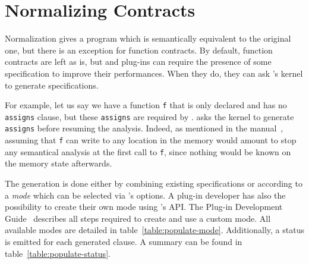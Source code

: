 \section{Normalizing Contracts}\label{sec:normalize-contracts}

Normalization gives a program which is semantically equivalent to the original
one, but there is an exception for function contracts. By default, function
contracts are left as is, but \FramaC and plug-ins can require the presence of
some specification to improve their performances. When they do, they can ask
\FramaC's kernel to generate specifications.

For example, let us say we have a function \texttt{f} that is only declared and
has no \acsl \texttt{assigns} clause, but these \texttt{assigns} are required by
\Eva. \Eva asks the kernel to generate \texttt{assigns} before resuming
the analysis. Indeed, as mentioned in the \acsl manual~\cite{acsl}, assuming
that \texttt{f} can write to any location in the memory would amount to stop any
semantical analysis at the first call to \texttt{f}, since nothing would be
known on the memory state afterwards.

The generation is done either by combining existing specifications or according
to a \emph{mode} which can be selected via \FramaC's options. A plug-in
developer has also the possibility to create their own mode using \FramaC's API.
The Plug-in Development Guide~\cite{plugin-dev-guide} describes all steps
required to create and use a custom mode. All available modes are detailed in
table~\ref{table:populate-mode}. Additionally, a status is emitted for each
generated clause. A summary can be found in table~\ref{table:populate-status}.


